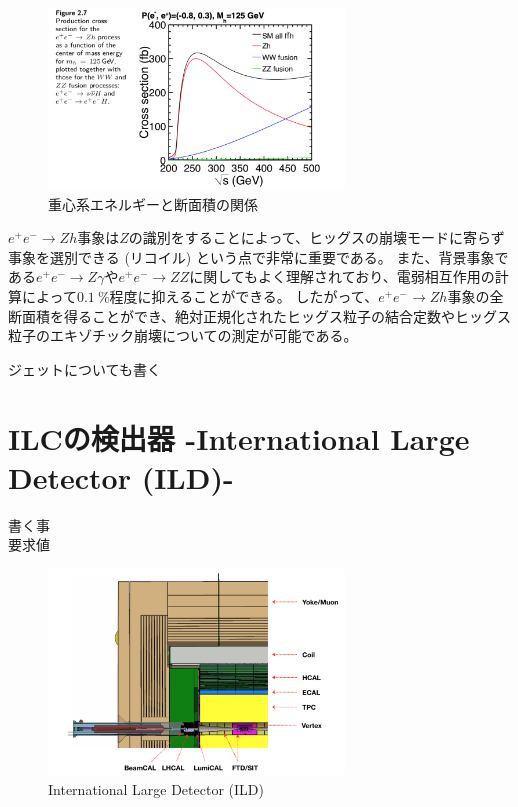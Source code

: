\begin{figure}[h]
 \centering
 \includegraphics[width=0.7\textwidth]{Figure/1Introduction/4eetoZH.png}
 \caption{重心系エネルギーと断面積の関係\cite{TechnicalDesignReportPhysics}}
 \label{4eetoZH}
\end{figure}

$e^+e^- \to Zh$事象は$Z$の識別をすることによって、ヒッグスの崩壊モードに寄らず事象を選別できる (リコイル) という点で非常に重要である。
また、背景事象である$e^+e^- \to Z\gamma$や$e^+e^- \to ZZ$に関してもよく理解されており、電弱相互作用の計算によって$0.1\ \%$程度に抑えることができる。\cite{GlobalProject}
したがって、$e^+e^- \to Zh$事象の全断面積を得ることができ、絶対正規化されたヒッグス粒子の結合定数やヒッグス粒子のエキゾチック崩壊についての測定が可能である。


ジェットについても書く\\


\section{ILCの検出器 -International Large Detector (ILD)-} \label{Intro:InternationalLargeDetector}

書く事\\
要求値\\

\begin{figure}[h]
 \centering
 \includegraphics[width=0.7\textwidth]{Figure/1Introduction/5ILD.png}
 \caption{International Large Detector (ILD)\cite{InterimDesignReport}}
 \label{5ILD}
\end{figure}


